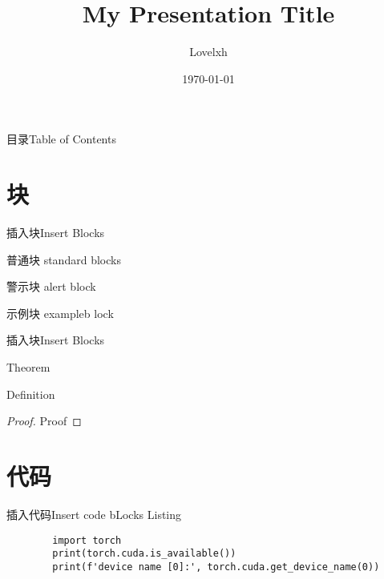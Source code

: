 \documentclass[aspectratio=169, UTF8]{ctexbeamer}
\author{Lovelxh}
\date{\today}
\title{My Presentation Title}
\begin{document}
\begin{frame}
    \maketitle
\end{frame}

\begin{frame}{目录}{Table of Contents}
    \centering
    \tableofcontents[hideallsubsections]
\end{frame}

\section[Block]{块}

\begin{frame}{插入块}{Insert Blocks}
    \begin{block}{普通块}
        standard blocks
    \end{block}
    \begin{alertblock}{警示块}
        alert block
    \end{alertblock}
    \begin{exampleblock}{示例块}
        exampleb lock
    \end{exampleblock}
\end{frame}

\begin{frame}{插入块}{Insert Blocks}
    \begin{theorem}
        Theorem
    \end{theorem}
    \begin{definition}
        Definition
    \end{definition}
    \begin{proof}
        Proof
    \end{proof}
\end{frame}
\section[Code block]{代码}

\begin{frame}[fragile]{插入代码}{Insert code bLocks}
    Listing
    \begin{lstlisting}
        import torch
        print(torch.cuda.is_available())
        print(f'device name [0]:', torch.cuda.get_device_name(0))
    \end{lstlisting}
\end{frame}
\end{document}
